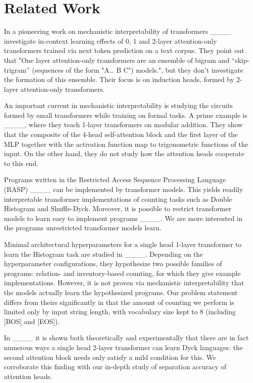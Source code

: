 \section{Related Work}
\label{sec:related}

In a pioneering work on mechanistic interpretability of transformers 
____ investigate in-context
learning effects of 0, 1 and 2-layer attention-only transformers trained via
next token prediction on a text corpus. They point out that "One layer
attention-only transformers are an ensemble of bigram and “skip-trigram”
(sequences of the form "A… B C") models.", but they don't investigate the
formation of this ensemble. Their focus is on induction heads, formed by
2-layer attention-only transformers.

An important current in mechanistic interpretability is studying the circuits formed by small transformers while training on formal tasks. A prime example is ____, where they teach 1-layer transformers on modular addition. They show that the composite of the 4-head self-attention block and the first layer of the MLP together with the activation function map to trigonometric functions of the input. On the other hand, they do not study how the attention heads cooperate to this end.

Programs written in the Restricted Access Sequence Processing Language (RASP)
____ can be implemented by transformer models. This yields
readily interpretable transformer implementations of counting tasks such as
Double Histogram and Shuffle-Dyck. Moreover, it is possible to restrict
transformer models to learn easy to implement programs
____. We are more interested in the programs
unrestricted transformer models learn.

Minimal architectural hyperparameters for a single head 1-layer transformer to
learn the Histogram task are studied in ____. Depending
on the hyperparameter configurations, they hypothesize two possible families
of programs: relation- and inventory-based counting, for which they give
example implementations. However, it is not proven via mechanistic
interpretability that the models actually learn the hypothesized programs. Our
problem statement differs from theirs significantly in that the amount of
counting we perform is limited only by input string length, with vocabulary
size kept to 8 (including [BOS] and [EOS]).

In ____ it is shown both theoretically and experimentally that there are in fact numerous ways a single head 2-layer transformer can learn Dyck languages: the second attention block needs only satisfy a mild condition for this. We corroborate this finding with our in-depth study of separation accuracy of attention heads.

